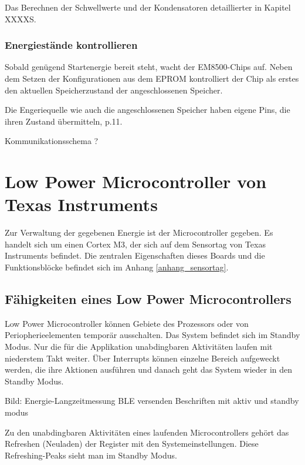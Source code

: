 Das Berechnen der Schwellwerte und der Kondensatoren detaillierter in Kapitel XXXXS.






\subsubsection{Energiestände kontrollieren}

Sobald genügend Startenergie bereit steht, wacht der EM8500-Chips auf. Neben dem Setzen der Konfigurationen aus dem EPROM kontrolliert der Chip als erstes den aktuellen Speicherzustand der angeschlossenen Speicher.

Die Engeriequelle wie auch die angeschlossenen Speicher haben eigene Pins, die ihren Zustand übermitteln\cite{datasheet_EM85}, p.11. 

Kommunikationsschema ? 

\section{Low Power Microcontroller von Texas Instruments}
Zur Verwaltung der gegebenen Energie ist der Microcontroller gegeben. Es handelt sich um einen Cortex M3, der sich auf dem Sensortag von Texas Instruments befindet. Die zentralen Eigenschaften dieses Boards und die Funktionsblöcke befindet sich im Anhang \ref{anhang_sensortag}.

\subsection{Fähigkeiten eines Low Power Microcontrollers}
  
Low Power Microcontroller können Gebiete des Prozessors oder von Periopherieelementen temporär ausschalten. Das System befindet sich im Standby Modus. Nur die für die Applikation unabdingbaren Aktivitäten laufen mit niederstem Takt weiter. Über Interrupts können einzelne Bereich aufgeweckt werden, die ihre Aktionen ausführen und danach geht das System wieder in den Standby Modus.

Bild: Energie-Langzeitmessung BLE versenden
Beschriften mit aktiv und standby modus

Zu den unabdingbaren Aktivitäten eines laufenden Microcontrollers gehört das Refreshen (Neuladen) der Register mit den Systemeinstellungen. Diese Refreshing-Peaks sieht man im Standby Modus.



